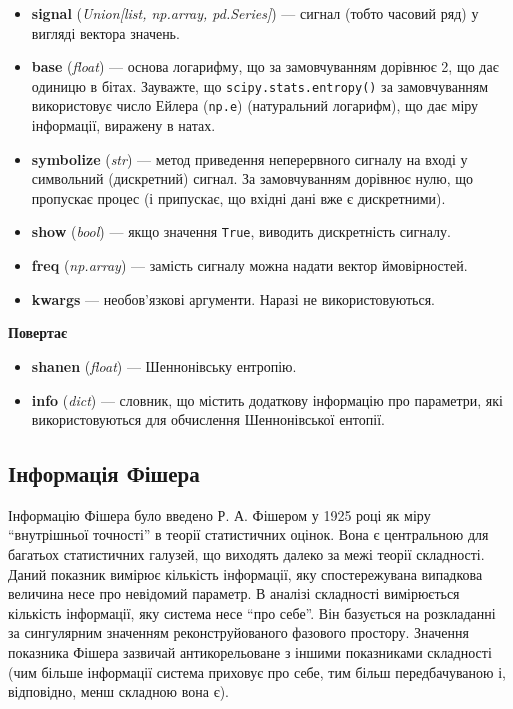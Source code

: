 \documentclass[
  letterpaper,
]{report}
\providecommand{\tightlist}{%
  \setlength{\itemsep}{0pt}\setlength{\parskip}{0pt}}\usepackage{longtable,booktabs,array}
\begin{document}
\begin{itemize}
\tightlist
\item
  \textbf{signal} (\emph{Union{[}list, np.array, pd.Series{]}}) ---
  сигнал (тобто часовий ряд) у вигляді вектора значень.
\item
  \textbf{base} (\emph{float}) --- основа логарифму, що за замовчуванням
  дорівнює 2, що дає одиницю в бітах. Зауважте, що
  \texttt{scipy.stats.entropy()} за замовчуванням використовує число
  Ейлера (\texttt{np.e}) (натуральний логарифм), що дає міру інформації,
  виражену в натах.
\item
  \textbf{symbolize} (\emph{str}) --- метод приведення неперервного
  сигналу на вході у символьний (дискретний) сигнал. За замовчуванням
  дорівнює нулю, що пропускає процес (і припускає, що вхідні дані вже є
  дискретними).
\item
  \textbf{show} (\emph{bool}) --- якщо значення \texttt{True}, виводить
  дискретність сигналу.
\item
  \textbf{freq} (\emph{np.array}) --- замість сигналу можна надати
  вектор ймовірностей.
\item
  \textbf{kwargs} --- необов'язкові аргументи. Наразі не
  використовуються.
\end{itemize}

\textbf{Повертає}

\begin{itemize}
\tightlist
\item
  \textbf{shanen} (\emph{float}) --- Шеннонівську ентропію.
\item
  \textbf{info} (\emph{dict}) --- словник, що містить додаткову
  інформацію про параметри, які використовуються для обчислення
  Шеннонівської ентопії.
\end{itemize}

\hypertarget{ux456ux43dux444ux43eux440ux43cux430ux446ux456ux44f-ux444ux456ux448ux435ux440ux430}{%
\subsection{Інформація
Фішера}\label{ux456ux43dux444ux43eux440ux43cux430ux446ux456ux44f-ux444ux456ux448ux435ux440ux430}}

Інформацію Фішера було введено Р. А. Фішером у 1925 році як міру
``внутрішньої точності'' в теорії статистичних оцінок. Вона є
центральною для багатьох статистичних галузей, що виходять далеко за
межі теорії складності. Даний показник вимірює кількість інформації, яку
спостережувана випадкова величина несе про невідомий параметр. В аналізі
складності вимірюється кількість інформації, яку система несе ``про
себе''. Він базується на розкладанні за сингулярним значенням
реконструйованого фазового простору. Значення показника Фішера зазвичай
антикорельоване з іншими показниками складності (чим більше інформації
система приховує про себе, тим більш передбачуваною і, відповідно, менш
складною вона є).
\end{document}
